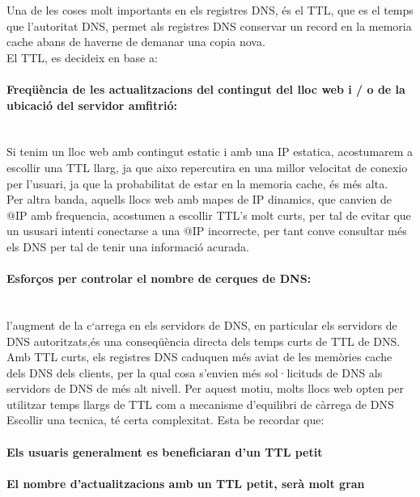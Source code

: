 \documentclass[a4paper, 10pt]{article}
\begin{document}
Una de les coses molt importants en els registres DNS, és el TTL, que es el temps que l'autoritat DNS, permet als registres DNS conservar un record en la memoria cache abans de haverne de demanar una copia nova.\\
El TTL, es decideix en base a:

\paragraph [bold]{Freqüència de les actualitzacions del contingut del lloc web i / o de la ubicació del servidor amfitrió:\\\\}

Si tenim un lloc web amb contingut estatic i amb una IP estatica, acostumarem a escollir una TTL llarg, ja que aixo repercutira
en una millor velocitat de conexio per l'usuari, ja que la probabilitat de estar en la memoria cache, és més alta.\\
Per altra banda, aquells llocs web amb mapes de IP dinamics, que canvien de @IP amb frequencia, acostumen a escollir TTL's molt curts, per tal de evitar que un ususari intenti conectarse a una @IP incorrecte, per tant conve consultar més els DNS per tal de tenir una informació acurada. 

\paragraph [bold]{Esforços per controlar el nombre de cerques de DNS:\\\\}
l’augment de la c`arrega en els servidors de DNS, en particular els servidors de DNS autoritzats,és una conseqüència directa dels temps curts de TTL de DNS. Amb TTL curts, els registres DNS caduquen més aviat de les memòries cache dels DNS dels clients, per la qual cosa s’envien més sol·licituds de DNS als servidors de DNS de més alt nivell. Per aquest motiu, molts llocs web opten per utilitzar temps llargs de TTL com a mecanisme d’equilibri de càrrega de DNS\\
Escollir una tecnica, té certa complexitat.
Esta be recordar que:

\paragraph [bold]{Els usuaris generalment es beneficiaran d'un TTL petit}
\paragraph [bold]{El nombre d'actualitzacions amb un TTL petit, serà molt gran}
\end{document}
